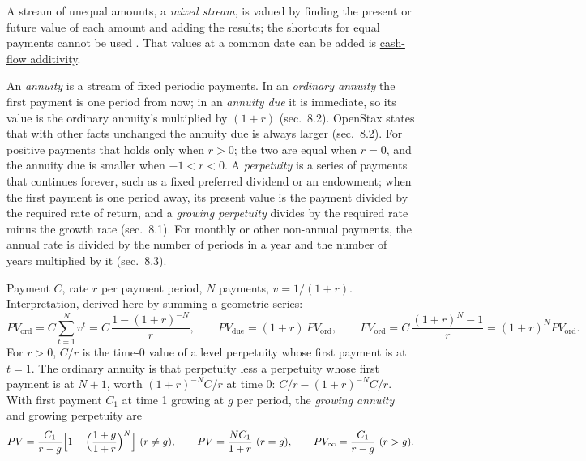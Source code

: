 \begin{qfmethod}\label{meth:cash-flow-streams}
 A stream of unequal amounts, a \emph{mixed stream}, is valued by finding the present or future value of each amount and adding the results; the shortcuts for equal payments cannot be used \citep[sec.~9.1]{principles-of-finance-2026}. That values at a common date can be added is \hyperref[res:cash-flow-additivity]{cash-flow additivity}.

An \emph{annuity} is a stream of fixed periodic payments. In an \emph{ordinary annuity} the first payment is one period from now; in an \emph{annuity due} it is immediate, so its value is the ordinary annuity's multiplied by $(1+r)$ (sec.~8.2). OpenStax states that with other facts unchanged the annuity due is always larger (sec.~8.2). For positive payments that holds only when $r>0$; the two are equal when $r=0$, and the annuity due is smaller when $-1<r<0$. A \emph{perpetuity} is a series of payments that continues forever, such as a fixed preferred dividend or an endowment; when the first payment is one period away, its present value is the payment divided by the required rate of return, and a \emph{growing perpetuity} divides by the required rate minus the growth rate (sec.~8.1). For monthly or other non-annual payments, the annual rate is divided by the number of periods in a year and the number of years multiplied by it (sec.~8.3).

 Payment $C$, rate $r$ per payment period, $N$ payments, $v=1/(1+r)$. Interpretation, derived here by summing a geometric series:
\[ PV_{\mathrm{ord}}=C\sum_{t=1}^{N}v^t=C\,\frac{1-(1+r)^{-N}}{r},\qquad PV_{\mathrm{due}}=(1+r)\,PV_{\mathrm{ord}},\qquad FV_{\mathrm{ord}}=C\,\frac{(1+r)^N-1}{r}=(1+r)^N PV_{\mathrm{ord}}. \]
For $r>0$, $C/r$ is the time-0 value of a level perpetuity whose first payment is at $t=1$. The ordinary annuity is that perpetuity less a perpetuity whose first payment is at $N+1$, worth $(1+r)^{-N}C/r$ at time 0: $C/r-(1+r)^{-N}C/r$. With first payment $C_1$ at time 1 growing at $g$ per period, the \emph{growing annuity} and growing perpetuity are
\[ PV=\frac{C_1}{r-g}\Bigl[1-\Bigl(\frac{1+g}{1+r}\Bigr)^{N}\Bigr]\ (r\neq g),\qquad PV=\frac{NC_1}{1+r}\ (r=g),\qquad PV_{\infty}=\frac{C_1}{r-g}\ (r>g). \]


\end{qfmethod}
